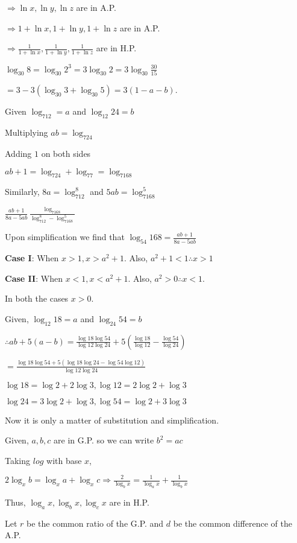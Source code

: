   $\Rightarrow \ln x, \ln y, \ln z$ are in A.P.

  $\Rightarrow 1 + \ln x, 1 + \ln y, 1 + \ln z$ are in A.P.

  $\Rightarrow \frac{1}{1 + \ln x}, \frac{1}{1 + \ln y}, \frac{1}{1 + \ln z}$ are in H.P.
\item $\log_{30}8 = \log_{30}2^3 = 3\log_{30}2 = 3\log_{30}\frac{30}{15}$

  $= 3 - 3(\log_{30}3 + \log_{30}5) = 3(1 - a - b)$.
\item Given $\log_712 = a$ and $\log_{12}24 = b$

  Multiplying $ab = \log_724$

  Adding $1$ on both sides

  $ab + 1 = \log_724 + \log_77 = \log_7168$

  Similarly, $8a = \log_712^8$ and $5ab = \log_7168^5$

  $\frac{ab + 1}{8a - 5ab} \frac{\log_7168}{\log_712^8 - \log_7168^5}$

  Upon simplification we find that $\log_{54}168 = \frac{ab + 1}{8a - 5ab}$
\item {\bf Case I}: When $x > 1, x > a^2 + 1$. Also, $a^2 + 1 < 1 \therefore x > 1$

  {\bf Case II}: When $x < 1, x < a^2 + 1$. Also, $a^2 > 0 \therefore x < 1$.

  In both the cases $x > 0$.
\item Given, $\log_{12}18 = a$ and $\log_{24}54 = b$

  $\therefore ab + 5(a - b) = \frac{\log 18\log 54}{\log 12\log 24} + 5\left(\frac{\log 18}{\log 12} - \frac{\log 54}{\log 24}\right)$

  $= \frac{\log 18\log 54 + 5(\log 18\log 24 - \log 54\log 12)}{\log 12\log 24}$

  $\log 18 = \log 2 + 2\log 3, \log 12 = 2\log 2 + \log 3$

  $\log 24 = 3\log 2 + \log 3, \log 54 = \log 2 + 3\log 3$

  Now it is only a matter of substitution and simplification.
\item Given, $a, b, c$ are in G.P. so we can write $b^2 = ac$

  Taking $log$ with base $x$,

  $2\log_xb = \log_xa + \log_xc \Rightarrow \frac{2}{\log_bx} = \frac{1}{\log_ax} + \frac{1}{\log_bx}$

  Thus, $\log_ax, \log_bx, \log_cx$ are in H.P.
\item Let $r$ be the common ratio of the G.P. and $d$ be the common difference of the A.P.

